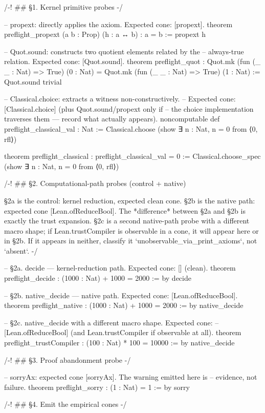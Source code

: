 /-! ## §1. Kernel primitive probes -/

-- propext: directly applies the axiom. Expected cone: [propext].
theorem preflight_propext (a b : Prop) (h : a ↔ b) : a = b :=
  propext h

-- Quot.sound: constructs two quotient elements related by the
-- always-true relation. Expected cone: [Quot.sound].
theorem preflight_quot :
    Quot.mk (fun (_ _ : Nat) => True) (0 : Nat) =
    Quot.mk (fun (_ _ : Nat) => True) (1 : Nat) :=
  Quot.sound trivial

-- Classical.choice: extracts a witness non-constructively.
-- Expected cone: [Classical.choice] (plus Quot.sound/propext only if
-- the choice implementation traverses them — record what actually appears).
noncomputable def preflight_classical_val : Nat :=
  Classical.choose (show ∃ n : Nat, n = 0 from ⟨0, rfl⟩)

theorem preflight_classical : preflight_classical_val = 0 :=
  Classical.choose_spec (show ∃ n : Nat, n = 0 from ⟨0, rfl⟩)

/-! ## §2. Computational-path probes (control + native)

    §2a is the control: kernel reduction, expected clean cone.
    §2b is the native path: expected cone [Lean.ofReduceBool].
    The *difference* between §2a and §2b is exactly the trust expansion.
    §2c is a second native-path probe with a different macro shape;
    if Lean.trustCompiler is observable in a cone, it will appear here
    or in §2b. If it appears in neither, classify it
    `unobservable_via_print_axioms`, not `absent`. -/

-- §2a. decide — kernel-reduction path. Expected cone: [] (clean).
theorem preflight_decide : (1000 : Nat) + 1000 = 2000 := by
  decide

-- §2b. native_decide — native path. Expected cone: [Lean.ofReduceBool].
theorem preflight_native : (1000 : Nat) + 1000 = 2000 := by
  native_decide

-- §2c. native_decide with a different macro shape. Expected cone:
-- [Lean.ofReduceBool] (and Lean.trustCompiler if observable at all).
theorem preflight_trustCompiler : (100 : Nat) * 100 = 10000 := by
  native_decide

/-! ## §3. Proof abandonment probe -/

-- sorryAx: expected cone [sorryAx]. The warning emitted here is
-- evidence, not failure.
theorem preflight_sorry : (1 : Nat) = 1 := by
  sorry

/-! ## §4. Emit the empirical cones -/

